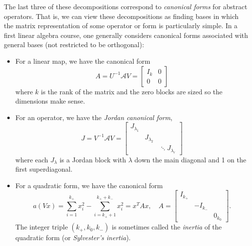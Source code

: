 \documentclass[12pt, leqno]{article} %
\begin{document}
The last three of these decompositions correspond to
{\em canonical forms} for abstract operators.  That is, we can view
these decompositions as finding bases in which the matrix
representation of some operator or form is particularly simple.
In a first linear algebra course, one generally considers canonical
forms associated with general bases (not restricted to be orthogonal):
\begin{itemize}
\item For a linear map, we have the canonical form
  \[
    A = U^{-1} \mathcal{A} V = \begin{bmatrix} I_k & 0 \\ 0 & 0 \end{bmatrix}
  \]
  where $k$ is the rank of the matrix and the zero blocks are sized
  so the dimensions make sense.
\item For an operator, we have the {\em Jordan canonical form},
  \[
    J = V^{-1} \mathcal{A} V =
    \begin{bmatrix} J_{\lambda_1} \\ & J_{\lambda_2} \\ & & \ddots
    J_{\lambda_r} \end{bmatrix}
  \]
  where each $J_{\lambda}$ is a Jordan block with $\lambda$ down the
  main diagonal and 1 on the first superdiagonal.
\item For a quadratic form, we have the canonical form
  \[
  a(Vx) = \sum_{i=1}^{k_+} x_i^2 - \sum_{i=k_++1}^{k_++k_-} x_i^2
        = x^T A x, \quad A = \begin{bmatrix} I_{k_+} \\ & -I_{k_-} \\ &
          & 0_{k_0} \end{bmatrix}.
  \]
  The integer triple $(k_+, k_0, k_-)$ is sometimes called the {\em inertia}
  of the quadratic form (or {\em Sylvester's inertia}).
\end{itemize}
\end{document}
